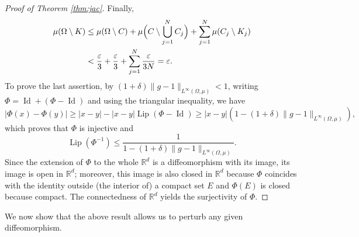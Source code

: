 \documentclass[11pt,a4paper]{article}
\newcommand{\Lip}{\operatorname{Lip}}
\newcommand{\Id}{\operatorname{Id}}
\theoremstyle{definition}
\theoremstyle{remark}
\begin{document}
\begin{proof}[Proof of Theorem \ref{thm:jac}]
Finally,
\begin{align*}
\mu(\Omega\setminus K)
&\le \mu(\Omega\setminus C)
+\mu\Bigl(C\setminus \bigcup_{j=1}^N C_j\Bigr)
+\sum_{j=1}^N \mu(C_j\setminus K_j)\\
&< \frac{\varepsilon}{3}+\frac{\varepsilon}{3}+\sum_{j=1}^N \frac{\varepsilon}{3N}
=\varepsilon.
\end{align*}
To prove the last assertion, by $(1+\delta)\|g-1\|_{L^\infty(\Omega,\mu)}< 1$, writing $\Phi=\Id + (\Phi-\Id)$ and using the triangular inequality, we have
$$
|\Phi(x)-\Phi(y)|\geq |x-y| - |x-y|\Lip(\Phi - \Id) 
\geq
|x-y|\left( 1- (1+\delta)\|g-1\|_{L^\infty(\Omega,\mu)}\right),
$$
which proves that $\Phi$ is injective and
$$
\Lip(\Phi^{-1})
\leq
\frac{1}{ 1- (1+\delta)\|g-1\|_{L^\infty(\Omega,\mu)}}.
$$
Since the extension of $\Phi$ to the whole $\mathbb{R}^d$ is a diffeomorphism with its image, its image is open in $\mathbb{R}^d$; moreover, this image is also closed in $\mathbb{R}^d$ because $\Phi$ coincides with the identity outside (the interior of) a compact set $E$ and $\Phi(E)$ is closed because compact. The connectedness of $\mathbb{R}^d$ yields the surjectivity of $\Phi$.
\end{proof}

We now show that the above result allows us to perturb any given diffeomorphism.
\end{document}
